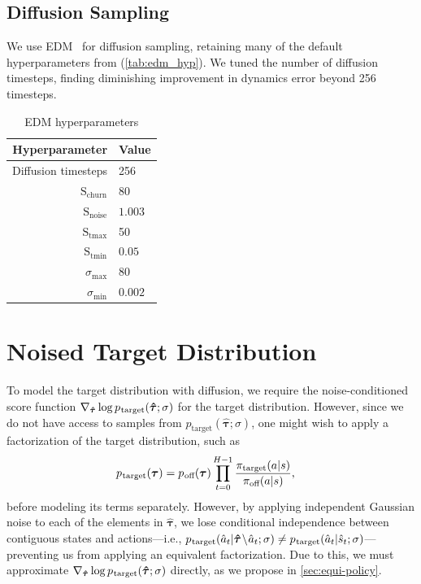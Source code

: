 \documentclass[10pt]{article} %
\theoremstyle{plain}
\theoremstyle{definition}
\theoremstyle{remark}
\newcommand{\ptarg}{p_{\mkern1mu\text{target}}}
\newcommand{\poff}{p_{\mkern1mu\text{off}}}
\begin{document}
\subsection{Diffusion Sampling}
We use EDM~\citep{karras2022elucidating} for diffusion sampling, retaining many of the default hyperparameters from \citet{lu2023synthetic} (\autoref{tab:edm_hyp}).
We tuned the number of diffusion timesteps, finding diminishing improvement in dynamics error beyond 256 timesteps.
\begin{table}[h!]
    \centering
    \caption{EDM hyperparameters}
    \begin{tabular}{@{}rl@{}}
        \toprule
        \textbf{Hyperparameter} & \textbf{Value} \\
        \midrule
        Diffusion timesteps & 256 \\
        $\text{S}_{\text{churn}}$ & 80 \\
        $\text{S}_{\text{noise}}$  & $1.003$ \\
        $\text{S}_{\text{tmax}}$  & 50 \\
        $\text{S}_{\text{tmin}}$  & $0.05$ \\
        $\sigma_{\text{max}}$  & 80 \\
        $\sigma_{\text{min}}$  & $0.002$ \\

        \bottomrule
    \end{tabular}
    \label{tab:edm_hyp}
\end{table}




\clearpage
\section{Noised Target Distribution}
\label{sec:noised-target}
To model the target distribution with diffusion, we require the noise-conditioned score function $\nabla_{\bm{\hat{\tau}}} \log \ptarg(\bm{\hat{\tau}};\sigma)$ for the target distribution.
However, since we do not have access to samples from $p_\text{target}(\bm{\hat{\tau}};\sigma)$, one might wish to apply a factorization of the target distribution, such as
\begin{align}
    \ptarg(\bm{\tau}) &= \poff(\bm{\tau}) \prod_{t=0}^{H-1} \frac{\pi_{\text{target}}(a|s)}{\pi_{\text{off}}(a|s)}\text{,}
\end{align}
before modeling its terms separately.
However, by applying independent Gaussian noise to each of the elements in $\bm{\hat{\tau}}$, we lose conditional independence between contiguous states and actions---i.e., $\ptarg(\hat{a}_t | \bm{\hat{\tau}}\! \setminus\! \hat{a}_t;\sigma) \neq \ptarg(\hat{a}_t | \hat{s}_t;\sigma)$---preventing us from applying an equivalent factorization.
Due to this, we must approximate $\nabla_{\bm{\hat{\tau}}} \log \ptarg(\bm{\hat{\tau}};\sigma)$ directly, as we propose in \autoref{sec:equi-policy}.
\end{document}
